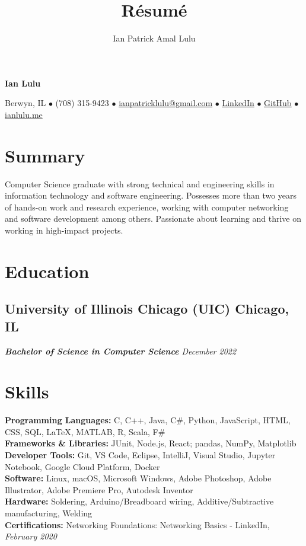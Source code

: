 \documentclass{article}
\makeatletter
\renewcommand{\maketitle}{
    \begin{center}
    {\bfseries\huge
    Ian Lulu}
    
    \vspace{0.25em}

    Berwyn, IL {$\bullet$} (708) 315-9423 {$\bullet$} \href{mailto:ianpatricklulu@gmail.com}{\underline{ianpatricklulu@gmail.com}} {$\bullet$} \href{https://www.linkedin.com/in/ianlulu/}{\underline{LinkedIn}} {$\bullet$} \href{https://github.com/IanLulu}{\underline{GitHub}} {$\bullet$} \url{ianlulu.me}
    
    \end{center}
}
\makeatother
\begin{document}
\title{R\'esum\'e}
\author{Ian Patrick Amal Lulu}


\maketitle
{} %


\section{Summary}
Computer Science graduate with strong technical and engineering skills in information technology and software engineering.
Possesses more than two years of hands-on work and research experience, working with computer networking and software development among others.
Passionate about learning and thrive on working in high-impact projects.


\section{Education}
\subsection{University of Illinois Chicago (UIC) \hfill \textnormal{Chicago, IL}}
\vspace{-0.5em}
\textit{\textbf{Bachelor of Science in Computer Science} \hfill December 2022}


\section{Skills}
\textbf{Programming Languages:} C, C++, Java, C\#, Python, JavaScript, HTML, CSS, SQL, {\LaTeX}, MATLAB, R, Scala, F\#
\\
\textbf{Frameworks \& Libraries:} JUnit, Node.js, React; pandas, NumPy, Matplotlib
\\
\textbf{Developer Tools:} Git, VS Code, Eclipse, IntelliJ, Visual Studio, Jupyter Notebook, Google Cloud Platform, Docker
\\
\textbf{Software:} Linux, macOS, Microsoft Windows, Adobe Photoshop, Adobe Illustrator, Adobe Premiere Pro, Autodesk Inventor
\\
\textbf{Hardware:} Soldering, Arduino/Breadboard wiring, Additive/Subtractive manufacturing, Welding
\\
\textbf{Certifications:} Networking Foundations: Networking Basics - LinkedIn, \textit{February 2020}
\end{document}
